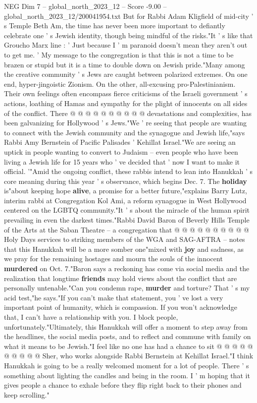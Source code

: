 \begin{textsample}{NEG Dim 7 – global\_north\_2023\_12 – Score -9.00 – global\_north\_2023\_12/200041954.txt}
But for Rabbi Adam Kligfield of mid-city ' s Temple Beth Am, the time has never been more important to defiantly celebrate one ' s Jewish identity, though being mindful of the risks."It ' s like that Groucho Marx line : ' Just because I ' m paranoid doesn't mean they aren't out to get me. ' My message to the congregation is that this is not a time to be brazen or stupid but it is a time to double down on Jewish pride."Many among the creative community ' s Jews are caught between polarized extremes.
On one end, hyper-jingoistic Zionism.
On the other, all-excusing pro-Palestinianism.
Their own feelings often encompass fierce criticisms of the Israeli government ' s actions, loathing of Hamas and sympathy for the plight of innocents on all sides of the conflict.
There @ @ @ @ @ @ @ @ @ @ devastations and complexities, has been galvanizing for Hollywood ' s Jews."We ' re seeing that people are wanting to connect with the Jewish community and the synagogue and Jewish life,"says Rabbi Amy Bernstein of Pacific Palisades ' Kehillat Israel."We are seeing an uptick in people wanting to convert to Judaism -- even people who have been living a Jewish life for 15 years who ' ve decided that ' now I want to make it official. '"Amid the ongoing conflict, these rabbis intend to lean into Hanukkah ' s core meaning during this year ' s observance, which begins Dec. 7.
The \textbf{holiday} is"about keeping hope \textbf{alive}, a promise for a better future,"explains Barry Lutz, interim rabbi at Congregation Kol Ami, a reform synagogue in West Hollywood centered on the LGBTQ community."It ' s about the miracle of the human spirit prevailing in even the darkest times."Rabbi David Baron of Beverly Hills Temple of the Arts at the Saban Theatre -- a congregation that @ @ @ @ @ @ @ @ @ @ Holy Days services to striking members of the WGA and SAG-AFTRA -- notes that this Hanukkah will be a more somber one"mixed with \textbf{joy} and sadness, as we pray for the remaining hostages and mourn the souls of the innocent \textbf{murdered} on Oct. 7."Baron says a reckoning has come via social media and the realization that longtime \textbf{friends} may hold views about the conflict that are personally untenable."Can you condemn rape, \textbf{murder} and torture?
That ' s my acid test,"he says."If you can't make that statement, you ' ve lost a very important point of humanity, which is compassion.
If you won't acknowledge that, I can't have a relationship with you.
I block people, unfortunately."Ultimately, this Hanukkah will offer a moment to step away from the headlines, the social media posts, and to reflect and commune with family on what it means to be Jewish."I feel like no one has had a chance to sit @ @ @ @ @ @ @ @ @ @ Sher, who works alongside Rabbi Bernstein at Kehillat Israel."I think Hanukkah is going to be a really welcomed moment for a lot of people.
There ' s something about lighting the candles and being in the room.
I ' m hoping that it gives people a chance to exhale before they flip right back to their phones and keep scrolling."

\end{textsample}
